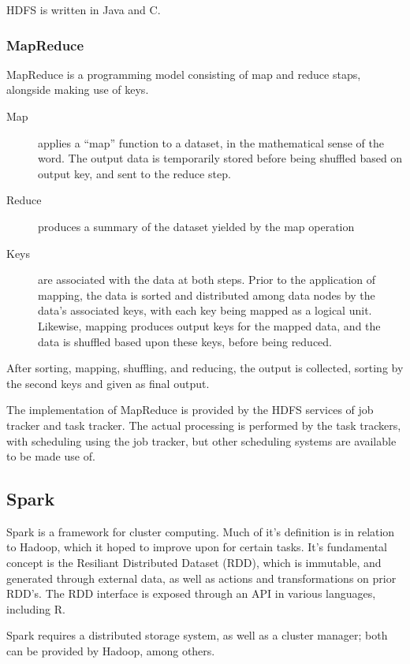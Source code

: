 \documentclass[10pt,a4paper]{article}
\begin{document}
HDFS is written in Java and C.

\subsubsection{MapReduce}
\label{sec:mapreduce}

MapReduce is a programming model consisting of map and reduce staps,
alongside making use of keys.

\begin{description}
\item[Map] applies a ``map'' function to a dataset, in the
  mathematical sense of the word. The output data is temporarily
  stored before being shuffled based on output key, and sent to the
  reduce step.
\item[Reduce] produces a summary of the dataset yielded by the map operation
\item[Keys] are associated with the data at both steps. Prior to the
  application of mapping, the data is sorted and distributed among
  data nodes by the data's associated keys, with each key being mapped
  as a logical unit. Likewise, mapping produces output keys for the
  mapped data, and the data is shuffled based upon these keys, before
  being reduced.
\end{description}

After sorting, mapping, shuffling, and reducing, the output is
collected, sorting by the second keys and given as final output.

The implementation of MapReduce is provided by the HDFS services of
job tracker and task tracker. The actual processing is performed by
the task trackers, with scheduling using the job tracker, but other
scheduling systems are available to be made use of.

\subsection{Spark}
\label{sec:spark}

Spark is a framework for cluster computing. Much of it's definition is
in relation to Hadoop, which it hoped to improve upon for certain
tasks. It's fundamental concept is the Resiliant Distributed Dataset
(RDD), which is immutable, and generated through external data, as
well as actions and transformations on prior RDD's. The RDD interface
is exposed through an API in various languages, including R.

Spark requires a distributed storage system, as well as a cluster
manager; both can be provided by Hadoop, among others.
\end{document}
